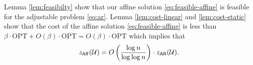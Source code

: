 \documentclass[moor]{informs1}              %
\newcommand{\opt}{\mathrm{OPT}}
\newcommand{\mb}[1]{\ensuremath{\boldsymbol{#1}}}
\begin{document}







Lemma \ref{lem:feasibilty} show that our affine solution \eqref{eq:feasible-affine} is feasible for the adjustable problem \eqref{eq:ar}. Lemma \ref{lem:cost-linear} and \ref{lem:cost-static} show that  the cost of the affine solution \eqref{eq:feasible-affine}  is less than $\beta  \cdot\opt +O( \beta) \cdot \opt = O(\beta ) \cdot \opt $ which implies that $$ z_{\sf Aff}({\cal U}) = O \left( \frac{\log n}{\log \log n} \right)\cdot z_{\sf AR}({\cal U}).$$
\hfill
\Halmos
\endproof
\end{document}
